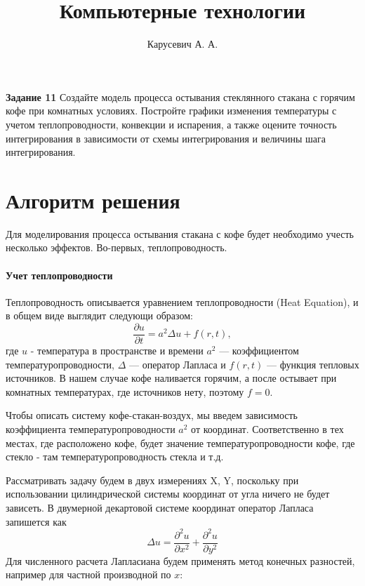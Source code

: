 



\title{Компьютерные технологии}
\author{Карусевич А. А.}




\maketitle

\textbf{Задание 11} Создайте модель процесса остывания стеклянного стакана с горячим кофе при 
комнатных условиях. Постройте графики изменения температуры с учетом теплопроводности, 
конвекции и испарения, а также оцените точность интегрирования в зависимости от схемы 
интегрирования и величины шага интегрирования.


\section{Алгоритм решения}
Для моделирования процесса остывания стакана с кофе будет необходимо учесть несколько эффектов. Во-первых, теплопроводность. 

\paragraph{Учет теплопроводности} Теплопроводность описывается уравнением теплопроводности (Heat Equation), и
в общем виде выглядит следующи образом:
\begin{equation}
	\frac{\partial u}{\partial t} = a^2 \Delta u + f(r,t),
\end{equation}
где $u$ - температура в пространстве и времени $a^2$ —  коэффициентом температуропроводности, $\Delta$ — оператор Лапласа и $f(r,t)$ — функция тепловых источников. 
В нашем случае кофе наливается горячим, а после остывает при комнатных температурах, где источников нету, поэтому $f = 0$.

Чтобы описать систему кофе-стакан-воздух, мы введем зависимость коэффициента температуропроводности $a^2$ от координат. Соответственно в тех местах,
где расположено кофе, будет значение температуропроводности кофе, где стекло - там температуропроводность стекла и т.д.


Рассматривать задачу будем в двух измерениях X, Y, поскольку при использовании цилиндрической системы координат от
угла ничего не будет зависеть.
В двумерной декартовой системе координат оператор Лапласа запишется как
\begin{equation}
	\Delta u = \frac{\partial^2 u}{\partial x^2} + \frac{\partial^2 u}{\partial y^2}
\end{equation}
Для численного расчета Лапласиана будем применять метод конечных разностей, например для частной производной по $x$:

